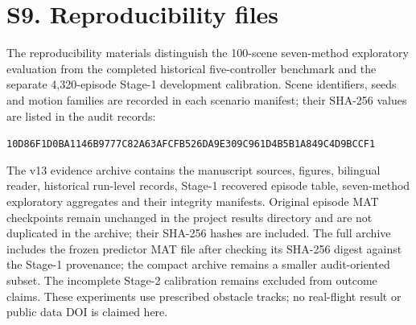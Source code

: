 \documentclass[10pt]{article}
\begin{document}
\section*{S9. Reproducibility files}
The reproducibility materials distinguish the 100-scene seven-method exploratory evaluation from the completed historical five-controller benchmark and the separate 4,320-episode Stage-1 development calibration. Scene identifiers, seeds and motion families are recorded in each scenario manifest; their SHA-256 values are listed in the audit records:
\begin{center}
\small\texttt{10D86F1D0BA1146B9777C82A63AFCFB526DA9E309C961D4B5B1A849C4D9BCCF1}
\end{center}
The v13 evidence archive contains the manuscript sources, figures, bilingual reader, historical run-level records, Stage-1 recovered episode table, seven-method exploratory aggregates and their integrity manifests. Original episode MAT checkpoints remain unchanged in the project results directory and are not duplicated in the archive; their SHA-256 hashes are included. The full archive includes the frozen predictor MAT file after checking its SHA-256 digest against the Stage-1 provenance; the compact archive remains a smaller audit-oriented subset. The incomplete Stage-2 calibration remains excluded from outcome claims. These experiments use prescribed obstacle tracks; no real-flight result or public data DOI is claimed here.
\end{document}
